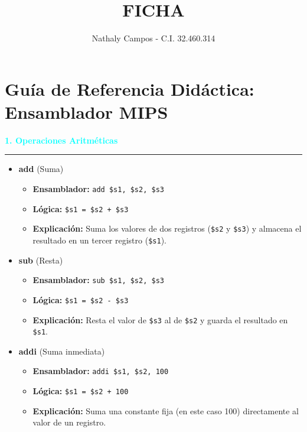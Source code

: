 \documentclass{article}
\title{FICHA}
\author{Nathaly Campos - C.I. 32.460.314}
\begin{document}
\maketitle
\section*{   Guía de Referencia Didáctica: Ensamblador MIPS}

\vspace{0.5cm}
\noindent\textcolor{cyan}{\Large\textbf{1. Operaciones Aritméticas}}
\vspace{0.2cm}\hrule\vspace{0.3cm}

\begin{itemize}
    \item \textbf{\large add} (Suma)
    \begin{itemize}
        \item \textbf{Ensamblador:} \texttt{add \$s1, \$s2, \$s3}
        \item \textbf{Lógica:} \texttt{\$s1 = \$s2 + \$s3}
        \item \textbf{Explicación:} Suma los valores de dos registros (\texttt{\$s2} y \texttt{\$s3}) y almacena el resultado en un tercer registro (\texttt{\$s1}).
    \end{itemize}
    \vspace{0.2cm}
    
    \item \textbf{\large sub} (Resta)
    \begin{itemize}
        \item \textbf{Ensamblador:} \texttt{sub \$s1, \$s2, \$s3}
        \item \textbf{Lógica:} \texttt{\$s1 = \$s2 - \$s3}
        \item \textbf{Explicación:} Resta el valor de \texttt{\$s3} al de \texttt{\$s2} y guarda el resultado en \texttt{\$s1}.
    \end{itemize}
    \vspace{0.2cm}
    
    \item \textbf{\large addi} (Suma inmediata)
    \begin{itemize}
        \item \textbf{Ensamblador:} \texttt{addi \$s1, \$s2, 100}
        \item \textbf{Lógica:} \texttt{\$s1 = \$s2 + 100}
        \item \textbf{Explicación:} Suma una constante fija (en este caso 100) directamente al valor de un registro.
    \end{itemize}
\end{itemize}
\end{document}
